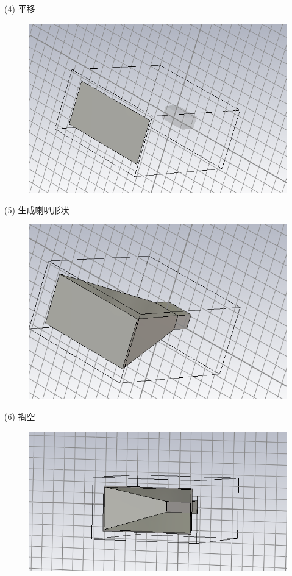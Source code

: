 \documentclass{source/Report}
\begin{document}
(4) 平移
\begin{figure}[H]
    \begin{center}
        \includegraphics[width=0.45\linewidth]{pic/cb2_p5.png}
        \caption{}
    \end{center}
\end{figure}
(5) 生成喇叭形状
\begin{figure}[H]
    \begin{center}
        \includegraphics[width=0.45\linewidth]{pic/cb2_p6.png}
        \caption{}
    \end{center}
\end{figure}
(6) 掏空
\begin{figure}[H]
    \begin{center}
        \includegraphics[width=0.45\linewidth]{pic/cb2_p7.png}
        \caption{}
    \end{center}
\end{figure}
\end{document}
